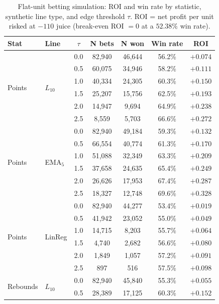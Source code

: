 \documentclass[12pt, letterpaper]{article}
\begin{document}
\begin{table}[H]
\centering
\caption{Flat-unit betting simulation: ROI and win rate by statistic,
         synthetic line type, and edge threshold $\tau$.
         ROI = net profit per unit risked at $-110$ juice (break-even
         ROI $= 0$ at a $52.38\%$ win rate).}
\label{tab:betting_full}
\small
\begin{tabular}{llccccc}
\toprule
\textbf{Stat} & \textbf{Line} & \textbf{$\tau$} & \textbf{N bets} & \textbf{N won} & \textbf{Win rate} & \textbf{ROI} \\
\midrule
\multirow{6}{*}{Points}
  & \multirow{6}{*}{$L_{10}$}
    & 0.0 & 82,940 & 46,644 & 56.2\% & $+0.074$ \\
  & & 0.5 & 60,075 & 34,946 & 58.2\% & $+0.111$ \\
  & & 1.0 & 40,334 & 24,305 & 60.3\% & $+0.150$ \\
  & & 1.5 & 25,207 & 15,756 & 62.5\% & $+0.193$ \\
  & & 2.0 & 14,947 &  9,694 & 64.9\% & $+0.238$ \\
  & & 2.5 &  8,559 &  5,703 & 66.6\% & $+0.272$ \\
\midrule
\multirow{6}{*}{Points}
  & \multirow{6}{*}{EMA$_5$}
    & 0.0 & 82,940 & 49,184 & 59.3\% & $+0.132$ \\
  & & 0.5 & 66,554 & 40,774 & 61.3\% & $+0.170$ \\
  & & 1.0 & 51,088 & 32,349 & 63.3\% & $+0.209$ \\
  & & 1.5 & 37,658 & 24,635 & 65.4\% & $+0.249$ \\
  & & 2.0 & 26,626 & 17,953 & 67.4\% & $+0.287$ \\
  & & 2.5 & 18,327 & 12,748 & 69.6\% & $+0.328$ \\
\midrule
\multirow{6}{*}{Points}
  & \multirow{6}{*}{LinReg}
    & 0.0 & 82,940 & 44,277 & 53.4\% & $+0.019$ \\
  & & 0.5 & 41,942 & 23,052 & 55.0\% & $+0.049$ \\
  & & 1.0 & 14,715 &  8,203 & 55.7\% & $+0.064$ \\
  & & 1.5 &  4,740 &  2,682 & 56.6\% & $+0.080$ \\
  & & 2.0 &  1,849 &  1,057 & 57.2\% & $+0.091$ \\
  & & 2.5 &    897 &    516 & 57.5\% & $+0.098$ \\
\midrule
\multirow{6}{*}{Rebounds}
  & \multirow{6}{*}{$L_{10}$}
    & 0.0 & 82,940 & 45,840 & 55.3\% & $+0.055$ \\
  & & 0.5 & 28,389 & 17,125 & 60.3\% & $+0.152$ \\

\end{tabular}
\end{table}
\end{document}
